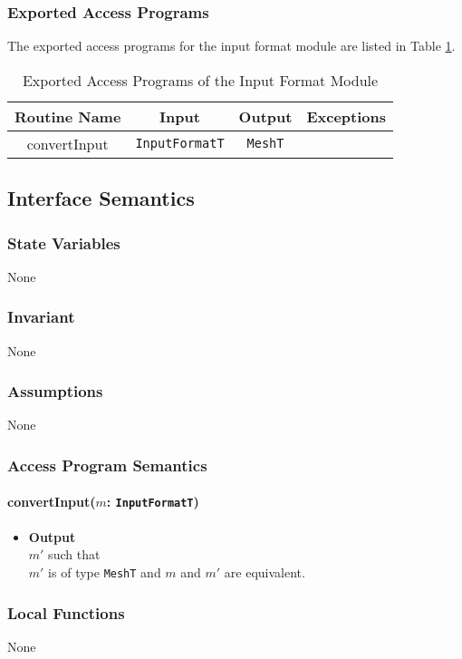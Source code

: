 \documentclass[12pt,titlepage]{article}
\begin{document}
\subsubsection{Exported Access Programs}
The exported access programs for the input format module are listed in Table \ref{AmisInputEAP}.
\begin{table}[htbp]
\centering
\begin{tabular}{|c|c|c|c|}
\hline
Routine Name & Input & Output & Exceptions \\ 
\hline
convertInput & {\tt InputFormatT} &{\tt MeshT} & \\
\hline
\end{tabular}
\caption{Exported Access Programs of the Input Format Module}
\label{AmisInputEAP} 
\end{table}

\subsection{Interface Semantics}
\subsubsection{State Variables}None
\subsubsection{Invariant} None
\subsubsection{Assumptions} None
\subsubsection{Access Program Semantics}
\paragraph{convertInput($m$: {\tt InputFormatT})}
\begin{itemize}
\item \textbf{Output}\\ 
$m'$ such that\\
$m'$ is of type {\tt MeshT} and $m$ and $m'$ are equivalent.
\end{itemize}

\subsubsection{Local Functions} 
None
\end{document}
